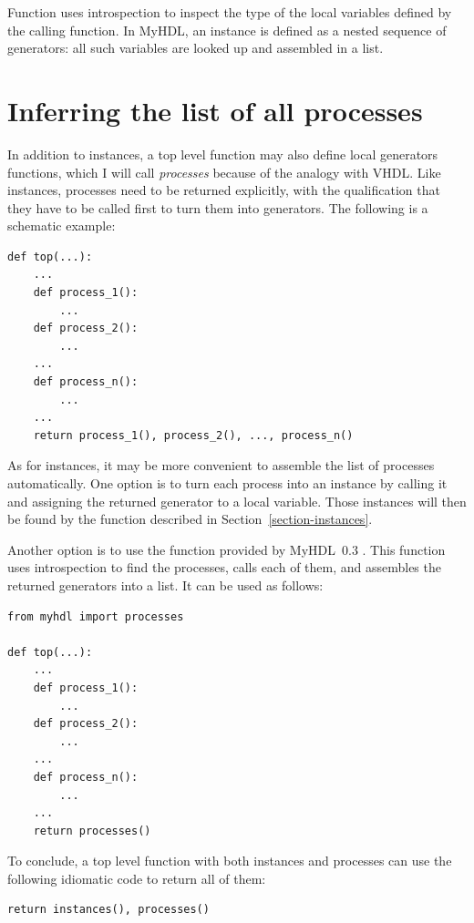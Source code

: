 \documentclass{howto}
\newcommand{\myhdl}{\protect \mbox{MyHDL}}
\begin{document}
Function  uses introspection to inspect the type
of the local variables defined by the calling function. In \myhdl {},
an instance is defined as a nested sequence of generators: all such
variables are looked up and assembled in a list.

\section{Inferring the list of all processes\label{section-processes}}

In addition to instances, a top level function may
also define local generators functions, which I will
call \emph{processes} because of the analogy with VHDL.
Like instances, processes need to be returned explicitly,
with the qualification that they have to be called first
to turn them into generators. The following is a schematic
example:

\begin{verbatim}
def top(...):
    ...
    def process_1():
        ...
    def process_2():
        ...
    ...
    def process_n():
        ...
    ...
    return process_1(), process_2(), ..., process_n()
\end{verbatim}

As for instances, it may be more convenient to assemble the list of
processes automatically. One option is to turn each process into an
instance by calling it and assigning the returned generator to a local
variable. Those instances will then be found by the
 function described in
Section~\ref{section-instances}.

Another option is to use the function  provided
by \myhdl\ 0.3 . This function uses introspection to find the
processes, calls each of them, and assembles the returned generators
into a list. It can be used as follows:

\begin{verbatim}
from myhdl import processes

def top(...):
    ...
    def process_1():
        ...
    def process_2():
        ...
    ...
    def process_n():
        ...
    ... 
    return processes()
\end{verbatim}

To conclude, a top level function with both instances and processes
can use the following idiomatic code to return all of them:

\begin{verbatim}
return instances(), processes()
\end{verbatim}
\end{document}
